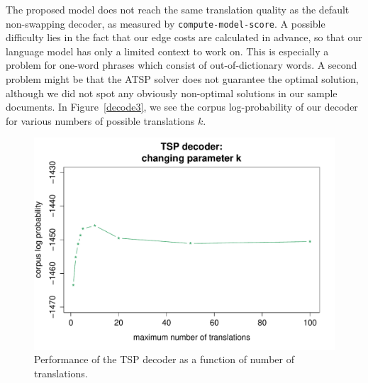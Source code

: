 The proposed model does not reach the same translation quality as the
default non-swapping decoder, as measured by \texttt{compute-model-score}.
A possible difficulty lies in the fact that our edge costs are calculated in
advance, so that our language model has only a limited context to work on.
This is especially a problem for one-word phrases which consist of
out-of-dictionary words. A second problem might be that the \textsc{ATSP}
solver does not guarantee the optimal solution, although we did not spot any
obviously non-optimal solutions in our sample documents. In
Figure~\ref{decode3}, we see the corpus log-probability of our decoder for
various numbers of possible translations $k$.

\begin{figure}
	\centering
	\includegraphics[scale=.5]{figures/TSP_k.pdf}
	\caption{Performance of the TSP decoder as a function of number of translations.}\label{swap}
\end{figure}
